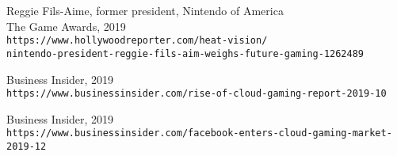 \documentclass[a4paper]{article}
\begin{document}
\renewcommand{\refname}{\section{References and Further Sources}}
\begin{thebibliography}{1}

Reggie Fils-Aime, former president, Nintendo of America\\The Game Awards, 2019
\\\texttt{https://www.hollywoodreporter.com/heat-vision/\\nintendo-president-reggie-fils-aim-weighs-future-gaming-1262489}

Business Insider, 2019
\\\texttt{https://www.businessinsider.com/rise-of-cloud-gaming-report-2019-10}

Business Insider, 2019
\\\texttt{https://www.businessinsider.com/facebook-enters-cloud-gaming-market-2019-12}

\end{thebibliography}
\end{document}
